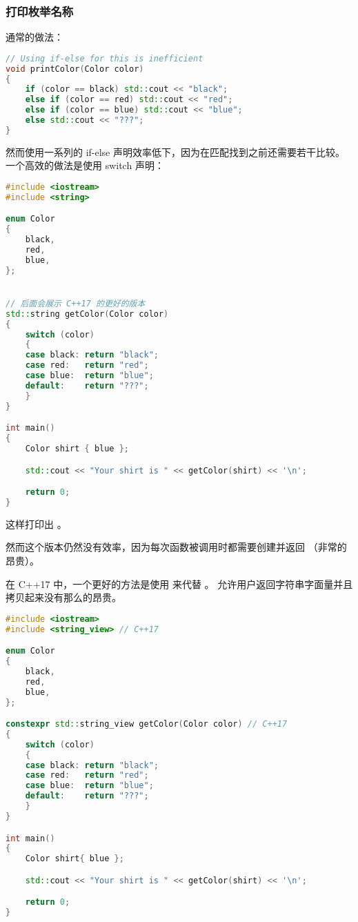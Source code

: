 \documentclass[../../LearnCpp.tex]{subfiles}
\begin{document}
\subsubsection*{打印枚举名称}

通常的做法：

\begin{lstlisting}[language=C++]
// Using if-else for this is inefficient
void printColor(Color color)
{
    if (color == black) std::cout << "black";
    else if (color == red) std::cout << "red";
    else if (color == blue) std::cout << "blue";
    else std::cout << "???";
}
\end{lstlisting}

然而使用一系列的 if-else 声明效率低下，因为在匹配找到之前还需要若干比较。
一个高效的做法是使用 switch 声明：

\begin{lstlisting}[language=C++]
#include <iostream>
#include <string>

enum Color
{
    black,
    red,
    blue,
};


// 后面会展示 C++17 的更好的版本
std::string getColor(Color color)
{
    switch (color)
    {
    case black: return "black";
    case red:   return "red";
    case blue:  return "blue";
    default:    return "???";
    }
}

int main()
{
    Color shirt { blue };

    std::cout << "Your shirt is " << getColor(shirt) << '\n';

    return 0;
}
\end{lstlisting}

这样打印出 。

然而这个版本仍然没有效率，因为每次函数被调用时都需要创建并返回 （非常的昂贵）。

在 C++17 中，一个更好的方法是使用  来代替 。
 允许用户返回字符串字面量并且拷贝起来没有那么的昂贵。

\begin{lstlisting}[language=C++]
#include <iostream>
#include <string_view> // C++17

enum Color
{
    black,
    red,
    blue,
};

constexpr std::string_view getColor(Color color) // C++17
{
    switch (color)
    {
    case black: return "black";
    case red:   return "red";
    case blue:  return "blue";
    default:    return "???";
    }
}

int main()
{
    Color shirt{ blue };

    std::cout << "Your shirt is " << getColor(shirt) << '\n';

    return 0;
}
\end{lstlisting}
\end{document}
